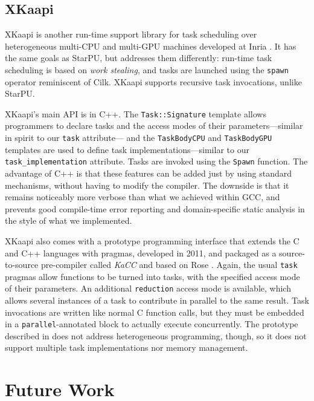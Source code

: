 \documentclass[twoside, a4paper, 10pt]{article}
\begin{document}
\subsection{XKaapi}
\label{sec-4-8}


XKaapi is another run-time support library for task scheduling over
heterogeneous multi-CPU and multi-GPU machines developed at Inria
\cite{ferreiralima:hal-00735470}.  It has the same goals as StarPU, but
addresses them differently: run-time task scheduling is based on \emph{work stealing}, and tasks are launched using the \texttt{spawn} operator reminiscent
of Cilk.  XKaapi supports recursive task invocations, unlike
StarPU.

XKaapi's main API is in C++.  The \texttt{Task::Signature} template allows
programmers to declare tasks and the access modes of their
parameters---similar in spirit to our \texttt{task} attribute--- and the
\texttt{TaskBodyCPU} and \texttt{TaskBodyGPU} templates are used to define task
implementations---similar to our \texttt{task\_implementation} attribute.  Tasks
are invoked using the \texttt{Spawn} function.  The advantage of C++ is that
these features can be added just by using standard mechanisms, without
having to modify the compiler.  The downside is that it remains
noticeably more verbose than what we achieved within GCC, and prevents
good compile-time error reporting and domain-specific static analysis in
the style of what we implemented.

XKaapi also comes with a prototype programming interface that extends
the C and C++ languages with pragmas, developed in 2011, and packaged as
a source-to-source pre-compiler called \emph{KaCC} and based on Rose
\cite{lementec11:xkaapi-api}.  Again, the usual \texttt{task} pragmas allow
functions to be turned into tasks, with the specified access mode of
their parameters.  An additional \texttt{reduction} access mode is available,
which allows several instances of a task to contribute in parallel to
the same result.  Task invocations are written like normal C function
calls, but they must be embedded in a \texttt{parallel}-annotated block to
actually execute concurrently.  The prototype described in
\cite{lementec11:xkaapi-api} does not address heterogeneous programming,
though, so it does not support multiple task implementations nor memory
management.
\section{Future Work}
\label{sec-5}
\end{document}
